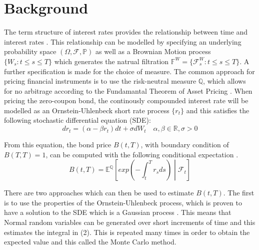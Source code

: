 \documentclass[12pt,a4paper]{article}
\begin{document}
\newpage
\section{Background}
\label{sec: Backgrd}

The term structure of interest rates provides the relationship between time and interest rates \citep{hull2016options}. This relationship can be modelled by specifying an underlying probability space $(\Omega,\mathcal{F},\mathbb{P})$ as well as a Brownian Motion process $\{W_{s}:t \leq s \leq T\}$ which generates the natrual filtration $\mathbb{F}^{W} = \{\mathcal{F}_{s}^{W}: t \leq s \leq T\}$. A further specification is made for the choice of measure. The common approach for pricing financial instruments is to use the risk-neutral measure $\mathbb{Q}$, which allows for no arbitrage according to the Fundamantal Theorem of Asset Pricing \citep{shreve2004stochastic}. When pricing the zero-coupon bond, the continously compounded interest rate will be modelled as an Ornstein-Uhlenbeck short rate process $\{r_t\}$ and this satisfies the following stochastic differential equation (SDE): 
\begin{equation}
dr_{t} = (\alpha-\beta r_{t})dt + \sigma dW_{t} \quad \alpha, \beta \in \mathbb{R}, \sigma>0
\end{equation}

From this equation, the bond price $B(t,T)$, with boundary condition of $B(T,T) = 1$, can be computed with the following conditional expectation \citep{mamon2004three}.
\begin{equation}
B(t,T) = \mathbb{E}^{\mathbb{Q}}\left[exp\left(-\int_{t}^{T}r_{s} ds\right)\middle\vert\mathcal{F}_{t}\right]
\end{equation}

There are two approaches which can then be used to estimate $B(t,T)$. The first is to use the properties of the Ornstein-Uhlenbeck process, which is proven to have a solution to the SDE which is a Gaussian process \citep{finch2004ornstein}. This means that Normal random variables can be generated over short increments of time and this estimates the integral in (2). This is repeated many times in order to obtain the expected value and this called the Monte Carlo method.
\end{document}
